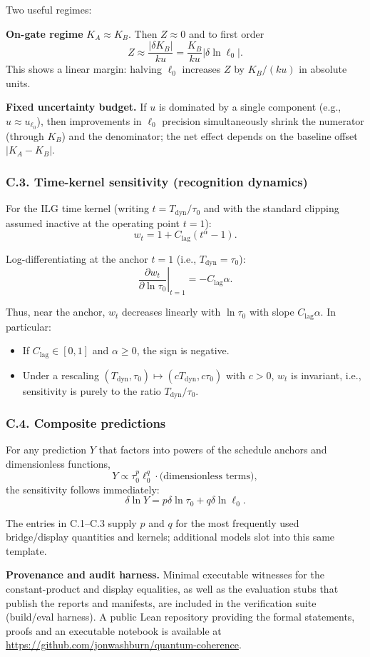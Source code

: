 \documentclass[12pt,a4paper]{article}
\theoremstyle{definition}
\theoremstyle{remark}
\begin{document}
Two useful regimes:

\textbf{On-gate regime} \(K_A \approx K_B\). Then \(Z \approx 0\) and to first order
$$Z \approx \frac{|\delta K_B|}{ku} = \frac{K_B}{ku} |\delta\ln\ell_0|.$$
This shows a linear margin: halving \(\ell_0\) increases \(Z\) by \(K_B/(ku)\) in absolute units.

\textbf{Fixed uncertainty budget.} If \(u\) is dominated by a single component (e.g., \(u \approx u_{\ell_0}\)), then improvements in \(\ell_0\) precision simultaneously shrink the numerator (through \(K_B\)) and the denominator; the net effect depends on the baseline offset \(|K_A - K_B|\).

\subsubsection*{C.3. Time-kernel sensitivity (recognition dynamics)}

For the ILG time kernel (writing \(t = T_{\text{dyn}}/\tau_0\) and with the standard clipping assumed inactive at the operating point \(t = 1\)):
$$w_t = 1 + C_{\text{lag}}(t^\alpha - 1).$$

Log-differentiating at the anchor \(t = 1\) (i.e., \(T_{\text{dyn}} = \tau_0\)):
$$\left.\frac{\partial w_t}{\partial\ln\tau_0}\right|_{t=1} = -C_{\text{lag}}\alpha.$$

Thus, near the anchor, \(w_t\) decreases linearly with \(\ln\tau_0\) with slope \(C_{\text{lag}}\alpha\). In particular:

\begin{itemize}
\item If \(C_{\text{lag}} \in [0,1]\) and \(\alpha \geq 0\), the sign is negative.
\item Under a rescaling \((T_{\text{dyn}}, \tau_0) \mapsto (cT_{\text{dyn}}, c\tau_0)\) with \(c > 0\), \(w_t\) is invariant, i.e., sensitivity is purely to the ratio \(T_{\text{dyn}}/\tau_0\).
\end{itemize}

\subsubsection*{C.4. Composite predictions}

For any prediction \(Y\) that factors into powers of the schedule anchors and dimensionless functions,
$$Y \propto \tau_0^p \ell_0^q \cdot \text{(dimensionless terms)},$$
the sensitivity follows immediately:
$$\delta\ln Y = p\delta\ln\tau_0 + q\delta\ln\ell_0.$$

The entries in C.1--C.3 supply \(p\) and \(q\) for the most frequently used bridge/display quantities and kernels; additional models slot into this same template.

\textbf{Provenance and audit harness.} Minimal executable witnesses for the constant-product and display equalities, as well as the evaluation stubs that publish the reports and manifests, are included in the verification suite (build/eval harness). A public Lean repository providing the formal statements, proofs and an executable notebook is available at \url{https://github.com/jonwashburn/quantum-coherence}.



\end{document}
